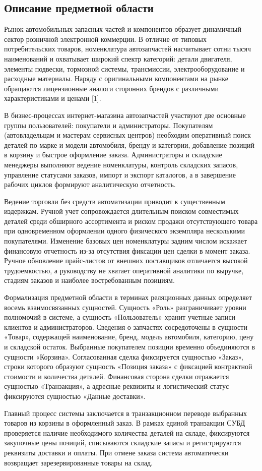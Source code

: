 \subsection{Описание предметной области}
\label{sec:analysis:domain}

Рынок автомобильных запасных частей и компонентов образует динамичный сектор розничной электронной коммерции. В отличие от типовых потребительских товаров, номенклатура автозапчастей насчитывает сотни тысяч наименований и охватывает широкий спектр категорий: детали двигателя, элементы подвески, тормозной системы, трансмиссии, электрооборудование и расходные материалы. Наряду с оригинальными компонентами на рынке обращаются лицензионные аналоги сторонних брендов с различными характеристиками и ценами [1].

В бизнес-процессах интернет-магазина автозапчастей участвуют две основные группы пользователей: покупатели и администраторы. Покупателям (автовладельцам и мастерам сервисных центров) необходим оперативный поиск деталей по марке и модели автомобиля, бренду и категории, добавление позиций в корзину и быстрое оформление заказа. Администраторы и складские менеджеры выполняют ведение номенклатуры, контроль складских запасов, управление статусами заказов, импорт и экспорт каталогов, а в завершение рабочих циклов формируют аналитическую отчетность.

Ведение торговли без средств автоматизации приводит к существенным издержкам. Ручной учет сопровождается длительным поиском совместимых деталей среди обширного ассортимента и риском продажи отсутствующего товара при одновременном оформлении одного физического экземпляра несколькими покупателями. Изменение базовых цен номенклатуры задним числом искажает финансовую отчетность из-за отсутствия фиксации цен сделки в момент заказа. Ручное обновление прайс-листов от внешних поставщиков отличается высокой трудоемкостью, а руководству не хватает оперативной аналитики по выручке, стадиям заказов и наиболее востребованным позициям.

Формализация предметной области в терминах реляционных данных определяет восемь взаимосвязанных сущностей. Сущность «Роль» разграничивает уровни полномочий в системе, а сущность «Пользователь» хранит учетные записи клиентов и администраторов. Сведения о запчастях сосредоточены в сущности «Товар», содержащей наименование, бренд, модель автомобиля, категорию, цену и складской остаток. Выбранные покупателем позиции временно объединяются в сущности «Корзина». Согласованная сделка фиксируется сущностью «Заказ», строки которого образуют сущность «Позиция заказа» с фиксацией контрактной стоимости и количества деталей. Финансовая сторона сделки отражается сущностью «Транзакция», а адресные реквизиты и логистический статус фиксируются сущностью «Данные доставки».

Главный процесс системы заключается в транзакционном переводе выбранных товаров из корзины в оформленный заказ. В рамках единой транзакции СУБД проверяется наличие необходимого количества деталей на складе, фиксируются закупочные цены позиций, списываются складские запасы и регистрируются реквизиты доставки и оплаты. При отмене заказа система автоматически возвращает зарезервированные товары на склад.
